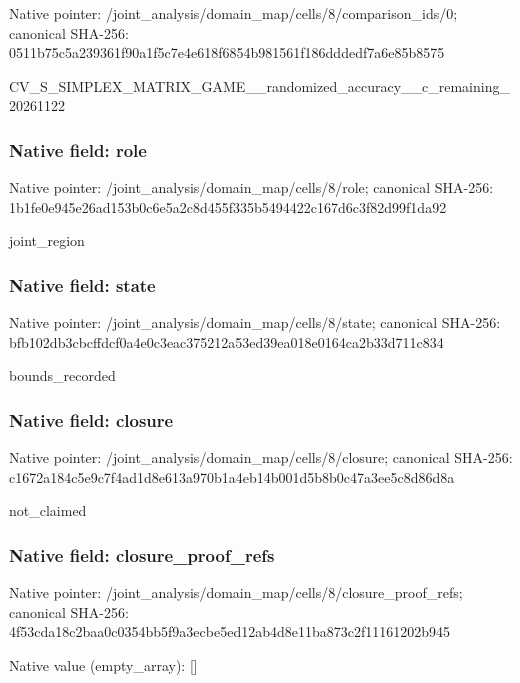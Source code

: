 \documentclass[10pt,a4paper]{article}
\begin{document}
Native pointer: /joint\_analysis/domain\_m\allowbreak{}ap/cells/8/comparison\_id\allowbreak{}s/0; canonical SHA-256: 0511b75c5a239361f90a1f5c\allowbreak{}7e4e618f6854b981561f186d\allowbreak{}ddedf7a6e85b8575


CV\_S\_SIMPLEX\_MATRIX\_GAME\allowbreak{}\_\_randomized\_accuracy\_\_c\allowbreak{}\_remaining\_20261122


\subsubsection{Native field: role}


Native pointer: /joint\_analysis/domain\_map/cells/8/role; canonical SHA-256: 1b1fe0e945e26ad153b0c6e5\allowbreak{}a2c8d455f335b5494422c167\allowbreak{}d6c3f82d99f1da92


joint\_region


\subsubsection{Native field: state}


Native pointer: /joint\_analysis/domain\_m\allowbreak{}ap/cells/8/state; canonical SHA-256: bfb102db3cbcffdcf0a4e0c3\allowbreak{}eac375212a53ed39ea018e01\allowbreak{}64ca2b33d711c834


bounds\_recorded


\subsubsection{Native field: closure}


Native pointer: /joint\_analysis/domain\_m\allowbreak{}ap/cells/8/closure; canonical SHA-256: c1672a184c5e9c7f4ad1d8e6\allowbreak{}13a970b1a4eb14b001d5b8b0\allowbreak{}c47a3ee5c8d86d8a


not\_claimed


\subsubsection{Native field: closure\_proof\_refs}


Native pointer: /joint\_analysis/domain\_m\allowbreak{}ap/cells/8/closure\_proof\allowbreak{}\_refs; canonical SHA-256: 4f53cda18c2baa0c0354bb5f\allowbreak{}9a3ecbe5ed12ab4d8e11ba87\allowbreak{}3c2f11161202b945



Native value (empty\_array): []
\end{document}
